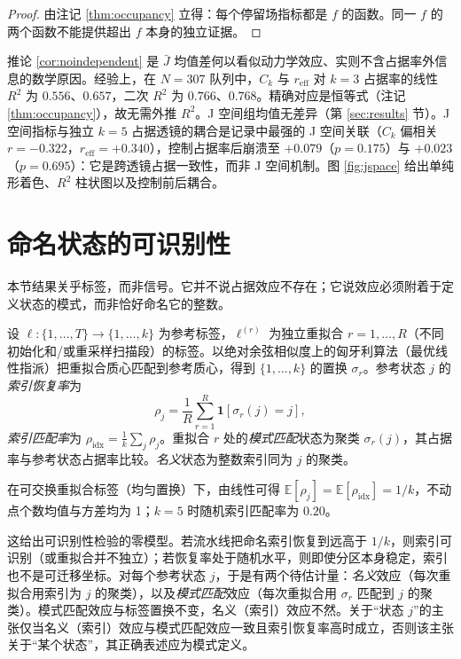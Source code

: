 \documentclass[11pt]{ctexart}
\theoremstyle{definition}
\newcommand{\E}{\mathbb{E}}
\newcommand{\one}{\mathbf{1}}
\begin{document}
\begin{proof}
由注记 \ref{thm:occupancy} 立得：每个停留场指标都是 $f$ 的函数。同一 $f$ 的两个函数不能提供超出 $f$ 本身的独立证据。
\end{proof}

推论 \ref{cor:noindependent} 是 $\bar J$ 均值差何以看似动力学效应、实则不含占据率外信息的数学原因。经验上，在 $N=307$ 队列中，$C_k$ 与 $r_{\mathrm{eff}}$ 对 $k=3$ 占据率的线性 $R^2$ 为 $0.556$、$0.657$，二次 $R^2$ 为 $0.766$、$0.768$。精确对应是恒等式（注记 \ref{thm:occupancy}），故无需外推 $R^2$。J 空间组均值无差异（第 \ref{sec:results} 节）。J 空间指标与独立 $k=5$ 占据透镜的耦合是记录中最强的 J 空间关联（$C_k$ 偏相关 $r=-0.322$，$r_{\mathrm{eff}}=+0.340$），控制占据率后崩溃至 $+0.079$（$p=0.175$）与 $+0.023$（$p=0.695$）：它是跨透镜占据一致性，而非 J 空间机制。图 \ref{fig:jspace} 给出单纯形着色、$R^2$ 柱状图以及控制前后耦合。

\section{命名状态的可识别性}
\label{sec:identifiability}

本节结果关乎标签，而非信号。它并不说占据效应不存在；它说效应必须附着于定义状态的模式，而非恰好命名它的整数。

设 $\ell:\{1,\dots,T\}\to\{1,\dots,k\}$ 为参考标签，$\ell^{(r)}$ 为独立重拟合 $r=1,\dots,R$（不同初始化和/或重采样扫描段）的标签。以绝对余弦相似度上的匈牙利算法（最优线性指派）把重拟合质心匹配到参考质心，得到 $\{1,\dots,k\}$ 的置换 $\sigma_r$。参考状态 $j$ 的\emph{索引恢复率}为
\begin{equation}
\rho_j=\frac1R\sum_{r=1}^{R}\one[\sigma_r(j)=j],
\end{equation}
\emph{索引匹配率}为 $\rho_{\mathrm{idx}}=\frac1k\sum_j\rho_j$。重拟合 $r$ 处的\emph{模式匹配}状态为聚类 $\sigma_r(j)$，其占据率与参考状态占据率比较。\emph{名义}状态为整数索引同为 $j$ 的聚类。

在可交换重拟合标签（均匀置换）下，由线性可得 $\E[\rho_j]=\E[\rho_{\mathrm{idx}}]=1/k$，不动点个数均值与方差均为 1；$k=5$ 时随机索引匹配率为 $0.20$。

这给出可识别性检验的零模型。若流水线把命名索引恢复到远高于 $1/k$，则索引可识别（或重拟合并不独立）；若恢复率处于随机水平，则即使分区本身稳定，索引也不是可迁移坐标。对每个参考状态 $j$，于是有两个待估计量：\emph{名义}效应（每次重拟合用索引为 $j$ 的聚类），以及\emph{模式匹配}效应（每次重拟合用 $\sigma_r$ 匹配到 $j$ 的聚类）。模式匹配效应与标签置换不变，名义（索引）效应不然。关于“状态 $j$”的主张仅当名义（索引）效应与模式匹配效应一致且索引恢复率高时成立，否则该主张关于“某个状态”，其正确表述应为模式定义。
\end{document}
